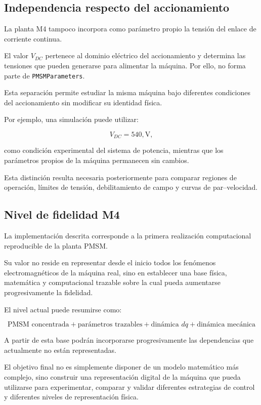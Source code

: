 \subsection{Independencia respecto del accionamiento}

La planta M4 tampoco incorpora como parámetro propio la tensión del enlace de corriente continua.

El valor $V_{DC}$ pertenece al dominio eléctrico del accionamiento y determina las tensiones que pueden generarse para alimentar la máquina. Por ello, no forma parte de \texttt{PMSMParameters}.

Esta separación permite estudiar la misma máquina bajo diferentes condiciones del accionamiento sin modificar su identidad física.

Por ejemplo, una simulación puede utilizar:

\begin{equation}
V_{DC}=540,\mathrm{V},
\end{equation}

como condición experimental del sistema de potencia, mientras que los parámetros propios de la máquina permanecen sin cambios.

Esta distinción resulta necesaria posteriormente para comparar regiones de operación, límites de tensión, debilitamiento de campo y curvas de par--velocidad.

\subsection{Nivel de fidelidad M4}

La implementación descrita corresponde a la primera realización computacional reproducible de la planta PMSM.

Su valor no reside en representar desde el inicio todos los fenómenos electromagnéticos de la máquina real, sino en establecer una base física, matemática y computacional trazable sobre la cual pueda aumentarse progresivamente la fidelidad.

El nivel actual puede resumirse como:

\begin{equation}
\boxed{
\text{PMSM concentrada}
+
\text{parámetros trazables}
+
\text{dinámica }dq
+
\text{dinámica mecánica}
}
\end{equation}

A partir de esta base podrán incorporarse progresivamente las dependencias que actualmente no están representadas.

El objetivo final no es simplemente disponer de un modelo matemático más complejo, sino construir una representación digital de la máquina que pueda utilizarse para experimentar, comparar y validar diferentes estrategias de control y diferentes niveles de representación física.

